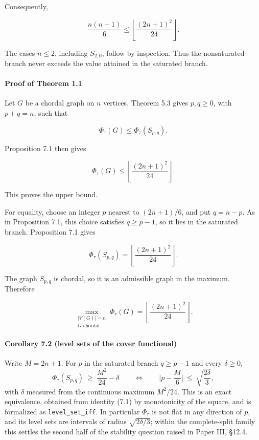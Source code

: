 \documentclass[
  american,
  11pt,
  a4paper,
]{article}
\begin{document}
Consequently,

\[
\frac{n(n-1)}6
\le
\left\lfloor\frac{(2n+1)^2}{24}\right\rfloor.
\]

The cases \(n\le2\), including \(S_{2,0}\), follow by inspection. Thus the nonsaturated branch never exceeds the value attained in the saturated branch.

\paragraph{Proof of Theorem 1.1}\label{proof-of-theorem-1.1}

Let \(G\) be a chordal graph on \(n\) vertices. Theorem 5.3 gives \(p,q\ge0\), with \(p+q=n\), such that

\[
\Phi_\tau(G)\le\Phi_\tau(S_{p,q}).
\]

Proposition 7.1 then gives

\[
\Phi_\tau(G)
\le
\left\lfloor\frac{(2n+1)^2}{24}\right\rfloor.
\]

This proves the upper bound.

For equality, choose an integer \(p\) nearest to \((2n+1)/6\), and put \(q=n-p\). As in Proposition 7.1, this choice satisfies \(q\ge p-1\), so it lies in the saturated branch. Proposition 7.1 gives

\[
\Phi_\tau(S_{p,q})
=
\left\lfloor\frac{(2n+1)^2}{24}\right\rfloor.
\]

The graph \(S_{p,q}\) is chordal, so it is an admissible graph in the maximum. Therefore

\[
\max_{\substack{|V(G)|=n\\G\text{ chordal}}}
\Phi_\tau(G)
=
\left\lfloor\frac{(2n+1)^2}{24}\right\rfloor.
\]

\paragraph{Corollary 7.2 (level sets of the cover functional)}\label{corollary-7.2-level-sets-of-the-cover-functional}

Write \(M=2n+1\). For \(p\) in the saturated branch \(q\ge p-1\) and every \(\delta\ge0\),
\[
\Phi_\tau(S_{p,q})\ \ge\ \frac{M^2}{24}-\delta\qquad\Longleftrightarrow\qquad \Big|p-\frac{M}{6}\Big|\ \le\ \sqrt{\frac{2\delta}{3}},
\]
with \(\delta\) measured from the continuous maximum \(M^2/24\). This is an exact equivalence, obtained from identity (7.1) by monotonicity of the square, and is formalized as \texttt{level\_set\_iff}. In particular \(\Phi_\tau\) is not flat in any direction of \(p\), and its level sets are intervals of radius \(\sqrt{2\delta/3}\); within the complete-split family this settles the second half of the stability question raised in Paper III, §12.4.
\end{document}
